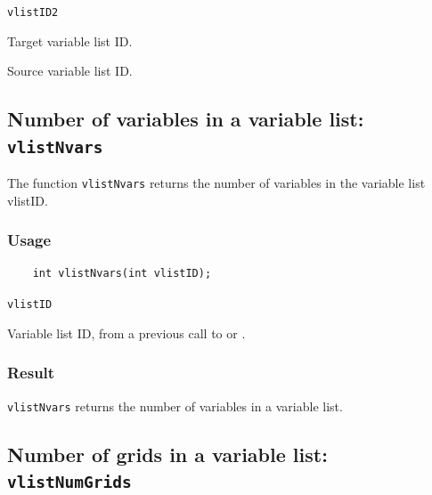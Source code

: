 \hspace*{4mm}\begin{minipage}[]{15cm}
\begin{deflist}{\texttt{vlistID2}\ }
\item[\texttt{vlistID2}]
Target variable list ID.
\item[\texttt{vlistID1}]
Source variable list ID.

\end{deflist}
\end{minipage}


\subsection{Number of variables in a variable list: \texttt{vlistNvars}}
\label{vlistNvars}

The function {\texttt{vlistNvars}} returns the number of variables in the variable list vlistID.

\subsubsection*{Usage}

\begin{verbatim}
    int vlistNvars(int vlistID);
\end{verbatim}

\hspace*{4mm}\begin{minipage}[]{15cm}
\begin{deflist}{\texttt{vlistID}\ }
\item[\texttt{vlistID}]
Variable list ID, from a previous call to {} or {}.

\end{deflist}
\end{minipage}

\subsubsection*{Result}

{\texttt{vlistNvars}} returns the number of variables in a variable list.



\subsection{Number of grids in a variable list: \texttt{vlistNumGrids}}
\label{vlistNumGrids}

